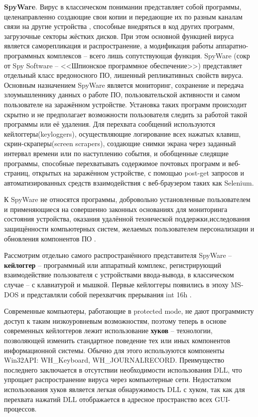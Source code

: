 	\textbf{SpyWare}. Вирус в классическом понимании представляет собой программы, целенаправленно создающие свои копии и передающие их по разным каналам связи на другие устройства , способные внедряться в код других программ, загрузочные секторы жёстких дисков. При этом основной функцией вируса является саморепликация и распространение, а модификация  работы аппаратно-программных комплексов -- всего лишь сопутствующая функция. SpyWare (сокр от Spy Software -- <<Шпионское программное обеспечение>>) представляет отдельный класс вредоносного ПО, лишенный репликативных свойств вируса. Основным назначением SpyWare является мониторинг, сохранение и передача злоумышленнику данных о работе ПО, пользовательской активности и самом пользователе  на заражённом устройстве. Установка таких программ происходит скрытно и не предполагает возможности пользователя следить за работой такой программы или её удаления.     Для перехвата сообщений используются кейлоггеры(keyloggers), осуществляющие логирование всех нажатых клавиш, скрин-скраперы(screen scrapers), создающие снимки экрана через заданный интервал времени или по наступлению события, и обобщенные следящие программы, способные перехватывать содержимое почтовых программ и веб-страниц, открытых на заражённом устройстве, с помощью post-get запросов и автоматизированных средств взаимодействия с веб-браузером таких как Selenium. 
	
	
	К SpyWare не относятся программы, добровольно установленные пользователем и применяющиеся на совершенно  законных основаниях  для мониторинга состояния устройства, оказания удалённой технической поддержки,исследования защищённости компьютерных систем, желаемых пользователем персонализации и обновления компонентов ПО \cite{MailWare1}. %
	
	Рассмотрим отдельно самого распространённого представителя SpyWare -- \textbf{кейлоггер} -- программный или аппаратный комплекс, регистрирующий взаимодействие пользователя с устройствами ввода-вывода, в классическом случае -- с клавиатурой и мышкой\cite{MailWare2}. %
	Первые кейлоггеры появились в эпоху MS-DOS и представляли собой перехватчик прерывания int  16h \cite{INT16H}.	 %
	
	
	Современные компьютеры, работающие в protected mode, не дают программисту доступ к таким низкоуровневым возможностям, поэтому теперь в основе современных кейлоггеров лежит использование \textbf{хуков} -- технологии, позволяющей изменить стандартное поведение тех или иных компонентов информационной системы. Обычно для этого используются компоненты Win32API: WH\_Keyboard, WH\_JOURNALRECORD. Преимущество последнего заключается в отсутствии необходимости использования DLL, что упрощает распространение вируса через компьютерные сети. Недостатком использования хуков является легкая обнаружимость DLL с хуком, так как для перехвата нажатий DLL отображается в адресное пространство всех GUI-процессов. 
	
